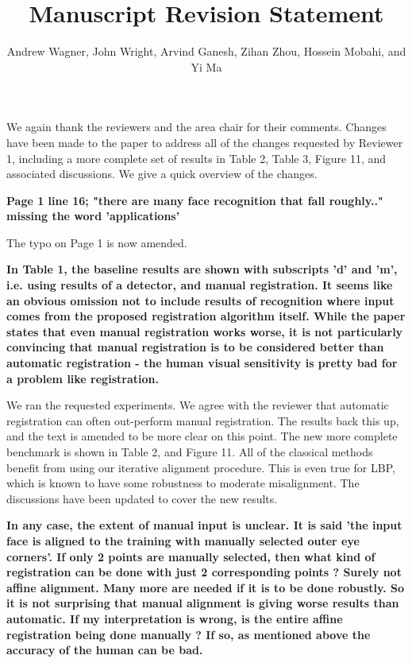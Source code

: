 \documentclass[11pt]{article}
\begin{document}
   

   \title{\Large {\bf Manuscript  Revision Statement}}

   \author{{Andrew Wagner, John Wright, Arvind Ganesh, Zihan Zhou, Hossein Mobahi, and Yi Ma}}

   \date{}
   \maketitle

We again thank the reviewers and the area chair for their comments.
Changes have been made to the paper to address all of the changes requested by Reviewer 1,
including a more complete set of results in Table 2, Table 3, Figure 11, and associated
discussions.  We give a quick overview of the changes.

{\bf
	Page 1 line 16; "there are many face recognition that fall roughly.."
	missing the word 'applications'
}

The typo on Page 1 is now amended.

{\bf
	In Table 1, the baseline results are shown with subscripts 'd' and 'm', i.e.
	using results of a detector, and manual registration. It seems like an obvious
	omission not to include results of recognition where input comes from the
	proposed registration algorithm itself. While the paper states that even
	manual registration works worse, it is not particularly convincing that manual
	registration is to be considered better than automatic registration - the
	human visual sensitivity is pretty bad for a problem like registration.
}

We ran the requested experiments.  We agree with the reviewer that automatic registration
can often out-perform manual registration.  The results back this up, and the text
is amended to be more clear on this point.  The new more complete benchmark is shown in
Table 2, and Figure 11.  All of the classical methods benefit from using our iterative
alignment procedure.  This is even true for LBP, which is known to have some robustness
to moderate misalignment.  The discussions have been updated to cover the new results.

{\bf
	In any case, the extent of manual input is unclear. It is said 'the input face
	is aligned to the training with manually selected outer eye corners'. If only
	2 points are manually selected, then what kind of registration can be done
	with just 2 corresponding points ? Surely not affine alignment. Many more are
	needed if it is to be done robustly. So it is not surprising that manual
	alignment is giving worse results than automatic. If my interpretation is
	wrong, is the entire affine registration being done manually ? If so, as
	mentioned above the accuracy of the human can be bad.
}
\end{document}
